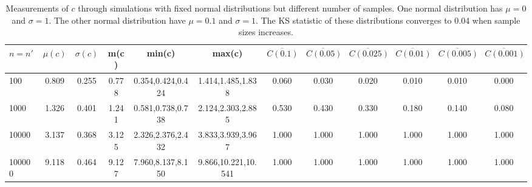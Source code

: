 \begin{table*}[h!]
\begin{center}
\begin{tabular}{| l | c | c | c | c | c | c | c | c | c | c | c |}\hline
$n=n'$ & $\mu(c)$ & $\sigma(c)$ & m(c) & min(c) & max(c) & $\overline{C(0.1)}$ & $\overline{C(0.05)}$ & $\overline{C(0.025)}$ & $\overline{C(0.01)}$ & $\overline{C(0.005)}$ & $\overline{C(0.001)}$ \\\hline
100 & 0.809 & 0.255 & 0.778 & 0.354,0.424,0.424 & 1.414,1.485,1.838  & 0.060  & 0.030  & 0.020  & 0.010  & 0.010  & 0.000 \\\hline
1000 & 1.326 & 0.401 & 1.241 & 0.581,0.738,0.738 & 2.124,2.303,2.885  & 0.530  & 0.430  & 0.330  & 0.180  & 0.140  & 0.080 \\\hline
10000 & 3.137 & 0.368 & 3.125 & 2.326,2.376,2.432 & 3.833,3.939,3.967  & 1.000  & 1.000  & 1.000  & 1.000  & 1.000  & 1.000 \\\hline
100000 & 9.118 & 0.464 & 9.127 & 7.960,8.137,8.150 & 9.866,10.221,10.541  & 1.000  & 1.000  & 1.000  & 1.000  & 1.000  & 1.000 \\\hline
\end{tabular}
\caption{Measurements of $c$ through simulations
        with fixed normal distributions but different number of samples.
        One normal distribution has $\mu=0$ and $\sigma=1$.
        The other normal distribution have $\mu=0.1$ and $\sigma=1$.
        The KS statistic of these distributions converges
        to 0.04 when sample sizes increases.}
\end{center}
\end{table*}